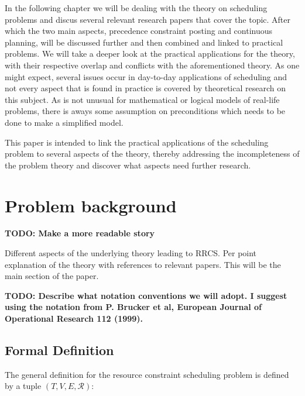 \documentclass{article}
\newcommand{\TODO}[1]{{\color{red}\textbf{TODO: #1}}}
\begin{document}
In the following chapter we will be dealing with the theory on scheduling problems and discus several relevant research papers that cover the topic.
After which the two main aspects, precedence constraint posting and continuous planning, will be discussed further and then combined and linked to practical problems.
We will take a deeper look at the practical applications for the theory, with their respective overlap and conflicts with the aforementioned theory.
As one might expect, several issues occur in day-to-day applications of scheduling and not every aspect that is found in practice is covered by theoretical research on this subject.
As is not unusual for mathematical or logical models of real-life problems, there is aways some assumption on preconditions which needs to be done to make a simplified model.

This paper is intended to link the practical applications of the scheduling problem to several aspects of the theory, thereby addressing the incompleteness of the problem theory and discover what aspects need further research.

\newpage

\section{Problem background}

\TODO{Make a more readable story}

Different aspects of the underlying theory leading to RRCS.
 Per point explanation of the theory with references to relevant papers.
This will be the main section of the paper.

\TODO{Describe what notation conventions we will adopt.
I suggest using the notation from P. Brucker et al, European Journal of Operational Research 112 (1999). }

\subsection{Formal Definition}
The general definition for the resource constraint scheduling problem is defined by a tuple $(T, V, E, \mathcal{R})$: \cite{brucker99}
\end{document}
